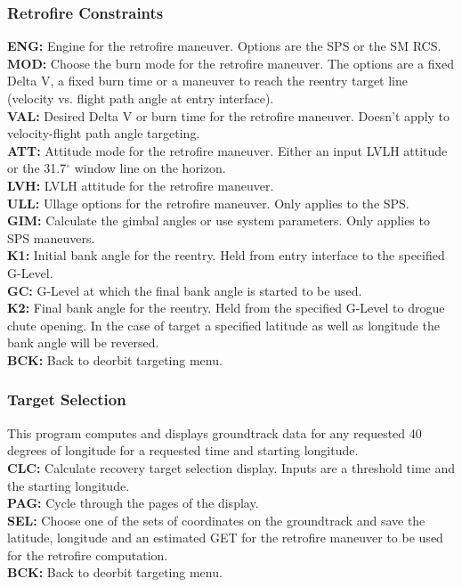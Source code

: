 \documentclass[11pt]{article} %
\begin{document}
\subsubsection{Retrofire Constraints}

\textbf{ENG:} Engine for the retrofire maneuver. Options are the SPS or the SM RCS.\\
\textbf{MOD:} Choose the burn mode for the retrofire maneuver. The options are a fixed Delta V, a fixed burn time or a maneuver to reach the reentry target line (velocity vs. flight path angle at entry interface).\\
\textbf{VAL:} Desired Delta V or burn time for the retrofire maneuver. Doesn't apply to velocity-flight path angle targeting.\\
\textbf{ATT:} Attitude mode for the retrofire maneuver. Either an input LVLH attitude or the 31.7$^{\circ}$ window line on the horizon.\\
\textbf{LVH:} LVLH attitude for the retrofire maneuver.\\
\textbf{ULL:} Ullage options for the retrofire maneuver. Only applies to the SPS.\\

\textbf{GIM:} Calculate the gimbal angles or use system parameters. Only applies to SPS maneuvers.\\
\textbf{K1:} Initial bank angle for the reentry. Held from entry interface to the specified G-Level.\\
\textbf{GC:} G-Level at which the final bank angle is started to be used.\\
\textbf{K2:} Final bank angle for the reentry. Held from the specified G-Level to drogue chute opening. In the case of target a specified latitude as well as longitude the bank angle will be reversed.\\
\textbf{BCK:} Back to deorbit targeting menu.\\

\subsubsection{Target Selection}

This program computes and displays groundtrack data for any requested 40 degrees of longitude for a requested time and starting longitude.\\

\textbf{CLC:} Calculate recovery target selection display. Inputs are a threshold time and the starting longitude.\\
\textbf{PAG:} Cycle through the pages of the display.\\
\textbf{SEL:} Choose one of the sets of coordinates on the groundtrack and save the latitude, longitude and an estimated GET for the retrofire maneuver to be used for the retrofire computation.\\
\textbf{BCK:} Back to deorbit targeting menu.\\
\end{document}
